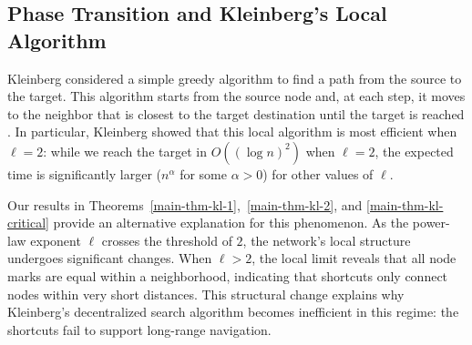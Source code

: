 \documentclass[10pt]{amsart}
\newtheorem{theorem}{Theorem}[section]
\begin{document}


\subsection{Phase Transition and Kleinberg's Local Algorithm}\label{sec:kl-app}

Kleinberg considered a simple greedy algorithm to find a path from the source to the target. This algorithm starts from the source node and, at each step, it moves to the neighbor that is closest to the target destination until the target is reached \cite{kleinberg}. In particular, Kleinberg showed that this local algorithm is most efficient when \( \ell = 2 \): while we reach the target in \( O\left((\log n)^2\right) \) when $\ell = 2$, the expected time is significantly larger ($n^\alpha$ for some $\alpha>0$) for other values of $\ell$.

Our results in Theorems~\ref{main-thm-kl-1},~\ref{main-thm-kl-2}, and \ref{main-thm-kl-critical} provide an alternative explanation for this phenomenon. 
As the power-law exponent \(\ell\) crosses the threshold of $2$, the network's local structure undergoes significant changes. When \(\ell > 2\), the local limit reveals that all node marks are equal within a neighborhood, indicating that shortcuts only connect nodes within very short distances. This structural change explains why Kleinberg’s decentralized search algorithm becomes inefficient in this regime: the shortcuts fail to support long-range navigation.
\end{document}
